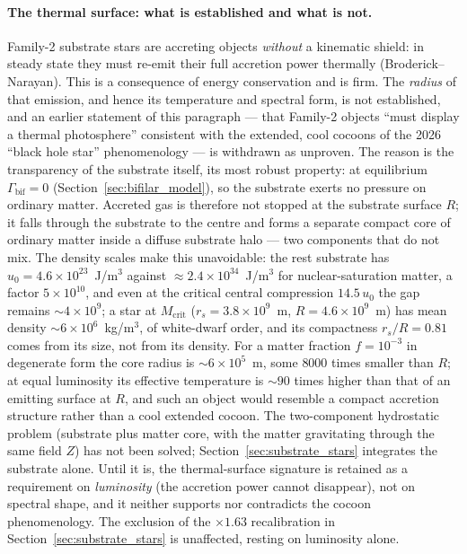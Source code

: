 \documentclass[11pt,a4paper]{article}
\theoremstyle{plain}
\theoremstyle{remark}
\begin{document}
\paragraph{The thermal surface: what is established and what is not.} Family-2 substrate stars are accreting objects \emph{without} a kinematic shield: in steady state they must re-emit their full accretion power thermally (Broderick--Narayan). This is a consequence of energy conservation and is firm. The \emph{radius} of that emission, and hence its temperature and spectral form, is not established, and an earlier statement of this paragraph --- that Family-2 objects ``must display a thermal photosphere'' consistent with the extended, cool cocoons of the 2026 ``black hole star'' phenomenology --- is withdrawn as unproven. The reason is the transparency of the substrate itself, its most robust property: at equilibrium $\Gamma_{\text{bif}} = 0$ (Section~\ref{sec:bifilar_model}), so the substrate exerts no pressure on ordinary matter. Accreted gas is therefore not stopped at the substrate surface $R$; it falls through the substrate to the centre and forms a separate compact core of ordinary matter inside a diffuse substrate halo --- two components that do not mix. The density scales make this unavoidable: the rest substrate has $u_0 = 4.6\times10^{23}$~J/m$^3$ against $\approx 2.4\times10^{34}$~J/m$^3$ for nuclear-saturation matter, a factor $5\times10^{10}$, and even at the critical central compression $14.5\,u_0$ the gap remains $\sim4\times10^{9}$; a star at $M_{\text{crit}}$ ($r_s = 3.8\times10^{9}$~m, $R = 4.6\times10^{9}$~m) has mean density $\sim6\times10^{6}$~kg/m$^3$, of white-dwarf order, and its compactness $r_s/R = 0.81$ comes from its size, not from its density. For a matter fraction $f = 10^{-3}$ in degenerate form the core radius is $\sim6\times10^{5}$~m, some $8000$ times smaller than $R$; at equal luminosity its effective temperature is $\sim90$ times higher than that of an emitting surface at $R$, and such an object would resemble a compact accretion structure rather than a cool extended cocoon. The two-component hydrostatic problem (substrate plus matter core, with the matter gravitating through the same field $Z$) has not been solved; Section~\ref{sec:substrate_stars} integrates the substrate alone. Until it is, the thermal-surface signature is retained as a requirement on \emph{luminosity} (the accretion power cannot disappear), not on spectral shape, and it neither supports nor contradicts the cocoon phenomenology. The exclusion of the $\times1.63$ recalibration in Section~\ref{sec:substrate_stars} is unaffected, resting on luminosity alone.
\end{document}
